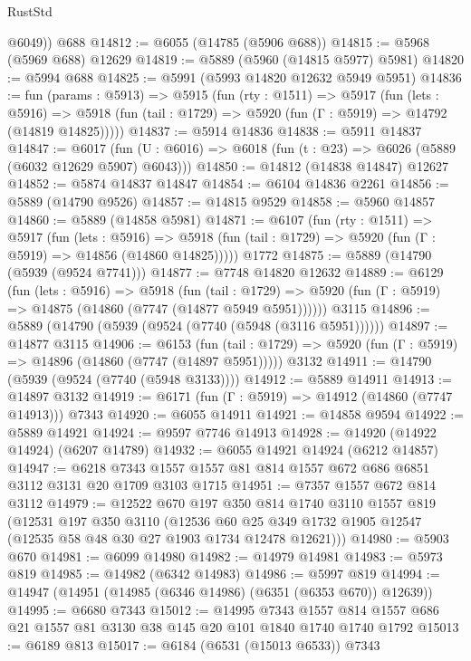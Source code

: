 \begin{lexlean}{RustStd}
\begin{coremodule}
        @6049))
    @688
@14812 := @6055 (@14785 (@5906 @688))
@14815 := @5968 (@5969 @688) @12629
@14819 := @5889 (@5960 (@14815 @5977) @5981)
@14820 := @5994 @688
@14825 := @5991 (@5993 @14820 @12632 @5949 @5951)
@14836 := fun (params : @5913) =>
  @5915
    (fun (rty : @1511) =>
    @5917
      (fun (lets : @5916) =>
      @5918 (fun (tail : @1729) => @5920 (fun (Γ : @5919) => @14792 (@14819 @14825)))))
@14837 := @5914 @14836
@14838 := @5911 @14837
@14847 := @6017
    (fun (U : @6016) => @6018 (fun (t : @23) => @6026 (@5889 (@6032 @12629 @5907) @6043)))
@14850 := @14812 (@14838 @14847) @12627
@14852 := @5874 @14837 @14847
@14854 := @6104 @14836 @2261
@14856 := @5889 (@14790 @9526)
@14857 := @14815 @9529
@14858 := @5960 @14857
@14860 := @5889 (@14858 @5981)
@14871 := @6107
    (fun (rty : @1511) =>
    @5917
      (fun (lets : @5916) =>
      @5918 (fun (tail : @1729) => @5920 (fun (Γ : @5919) => @14856 (@14860 @14825)))))
    @1772
@14875 := @5889 (@14790 (@5939 (@9524 @7741)))
@14877 := @7748 @14820 @12632
@14889 := @6129
    (fun (lets : @5916) =>
    @5918
      (fun (tail : @1729) =>
      @5920 (fun (Γ : @5919) => @14875 (@14860 (@7747 (@14877 @5949 @5951))))))
    @3115
@14896 := @5889 (@14790 (@5939 (@9524 (@7740 (@5948 (@3116 @5951))))))
@14897 := @14877 @3115
@14906 := @6153
    (fun (tail : @1729) => @5920 (fun (Γ : @5919) => @14896 (@14860 (@7747 (@14897 @5951)))))
    @3132
@14911 := @14790 (@5939 (@9524 (@7740 (@5948 @3133))))
@14912 := @5889 @14911
@14913 := @14897 @3132
@14919 := @6171 (fun (Γ : @5919) => @14912 (@14860 (@7747 @14913))) @7343
@14920 := @6055 @14911
@14921 := @14858 @9594
@14922 := @5889 @14921
@14924 := @9597 @7746 @14913
@14928 := @14920 (@14922 @14924) (@6207 @14789)
@14932 := @6055 @14921 @14924 (@6212 @14857)
@14947 := @6218 @7343 @1557 @1557 @81 @814 @1557 @672 @686 @6851 @3112 @3131 @20 @1709 @3103 @1715
@14951 := @7357 @1557 @672 @814 @3112
@14979 := @12522
    @670
    @197
    @350
    @814
    @1740
    @3110
    @1557
    @819
    (@12531
      @197
      @350
      @3110
      (@12536 @60 @25 @349 @1732 @1905 @12547 (@12535 @58 @48 @30 @27 @1903 @1734 @12478 @12621)))
@14980 := @5903 @670
@14981 := @6099 @14980
@14982 := @14979 @14981
@14983 := @5973 @819
@14985 := @14982 (@6342 @14983)
@14986 := @5997 @819
@14994 := @14947 (@14951 (@14985 (@6346 @14986) (@6351 (@6353 @670)) @12639))
@14995 := @6680 @7343
@15012 := @14995
    @7343
    @1557
    @814
    @1557
    @686
    @21
    @1557
    @81
    @3130
    @38
    @145
    @20
    @101
    @1840
    @1740
    @1740
    @1792
@15013 := @6189 @813
@15017 := @6184 (@6531 (@15013 @6533)) @7343

\end{coremodule}
\end{lexlean}
